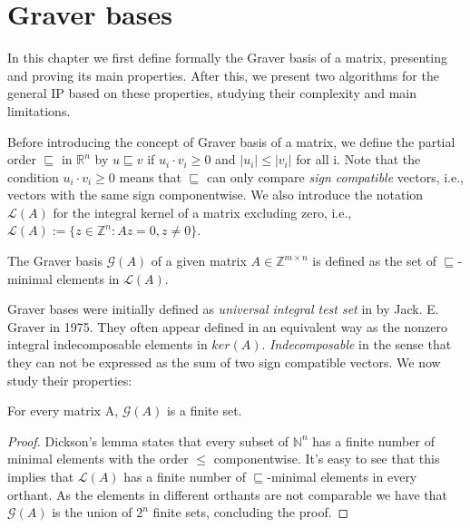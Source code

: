 \chapter{Graver bases} \label{2.Graver_bases}

In this chapter we first define formally the Graver basis of a matrix, presenting and proving its main properties. After this, we present two algorithms for the general IP based on these properties, studying their complexity and main limitations. 

Before introducing the concept of Graver basis of a matrix, we define the partial order $\sqsubseteq$ in $\mathbb{R}^n$ by $u \sqsubseteq v$ if $u_i \cdot v_i \geq 0$ and $|u_i| \leq |v_i|$ for all i. Note that the condition $u_i \cdot v_i \geq 0$ means that $\sqsubseteq$ can only compare \textit{sign compatible} vectors, i.e., vectors with the same sign componentwise. We also introduce the notation $\mathcal{L}(A)$ for the integral kernel of a matrix excluding zero, i.e., $\mathcal{L}(A) := \{z \in \mathbb{Z}^n: Az = 0, z\neq0\}$.

\begin{definition}
The Graver basis $\mathcal{G}(A)$ of a given matrix $A \in \mathbb{Z}^{m \times n}$ is defined as the set of $\sqsubseteq$-minimal elements in $\mathcal{L}(A)$.
\end{definition}

\vspace{-5pt}
Graver bases were initially defined as \textit{universal integral test set} in \cite{GRAVER:1975} by Jack. E. Graver in 1975. They often appear defined in an equivalent way as the nonzero integral indecomposable elements in $ker(A)$. \emph{Indecomposable} in the sense that they can not be expressed as the sum of two sign compatible vectors. We now study their properties:

\begin{proposition}\label{GB_finite}
For every matrix A, $\mathcal{G}(A)$ is a finite set.
\end{proposition}
\vspace{-20pt}
\begin{proof}
Dickson's lemma states that every subset of $\mathbb{N}^n$ has a finite number of minimal elements with the order $\leq$ componentwise. It's easy to see that this implies that $\mathcal{L}(A)$ has a finite number of $\sqsubseteq$-minimal elements in every orthant. As the elements in different orthants are not comparable we have that $\mathcal{G}(A)$ is the union of $2^n$ finite sets, concluding the proof.
\end{proof}

